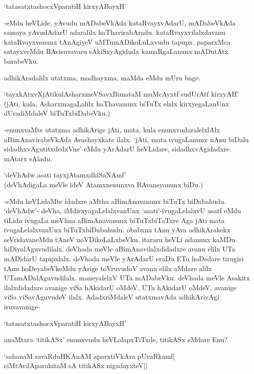 \begin{shloka}
`tatasatxtashocxVparatiH kirxyABayxH'
\end{shloka}

-eMdu heVLide. yAvudu mADabeVkAda kataRvayxvAdarU, mADabeVkAda samaya yAvudAdarU adaralilx haThavirabAradu. kataRvayxvilalxdavanu kataRvayxvanunx tAnAgiyeV uMTumADikoLuLxvudu tapupx. paparxMca satayxveMdu BAvisuvavaru sAkiSxyAgidudx kamaRgaLanunx mADutAtx barabeVku.

adhikAradalilx utatxma, madhayxma, maMda eMdu mUru bage.

`tayxkAtxvXjAtikulAsharxmeVSavxBimataM muMcAyxtf sudUrAtf kirxyAH' (jAti, kula, AsharxmagaLalilx haThavanunx biTuTx elalx kirxyegaLanUnx dUradiMdaleV biTuTxbiDabeVku.)

-enunxvaMte utatxma adhikArige jAti, mata, kula enunxvudaralelxlAlx aBimAnavirabeVkAda Avashayxkate ilalx. `jAti, mata ivugaLanunx nAnu biDalu sidadhxvAgutitxdedxVne' eMdu yArAdarU heVLidare, sidadhxvAgidadxre mAtarx sAladu.

\begin{shloka}
`deVhAdw asati tayxjAtamxdhiSaNAmf'\\
(deVhAdigaLa meVle ideV Atamxnenunxva BAvaneyanunx biDu.)
\end{shloka}

-eMdu heVLidaMte idadxre aMtha aBimAnavanunx biTuTx biDabahudu. `deVhAdw'- deVha, iMdirxyagaLelalxvanUnx `asati'-ivugaLelalxvU asatf eMdu tiLidu ivugaLa meVlina aBimAnavanunx biTuTxbiTaTxre Aga jAti mata ivugaLelalxvanUnx biTuTxbiDabahudu. obabxnu tAnu yAva adhikArakekx seVridavaneMdu tAneV noVDikoLaLxbeVku. itararu heVLi adanunx kaMDu hiDiyalAguvudilalx. deVhada meVle aBimAnavilalxdidadxre avanu elilx UTa mADidarU tapipxlalx. deVhada meVle yArAdarU eraDu ETu hoDedare tirugisi tAnu hoDeyabeVkeMdu yArige toVruvudoV avanu elilx aMdare alilx UTamADalAguvudilalx. maneyalelxV UTa mADabeVku. deVhada meVle Asakitx ilalxdidadxre avanige viSa hAkidarU oMdeV, UTa hAkidarU oMdeV, avanige viSa viSavAguvudeV ilalx. AdadxriMdaleV utatxmavAda adhikAriyAgi iruvavanige- 

\begin{shloka}
`tatasatxtashocxVparatiH kirxyABayxH'
\end{shloka}

anaMtara `titikASx' enunxvudu heVLalapxTiTxde, titikASx eMdare Enu?

\begin{shloka}
`sahanaM savaRduHKAnAM aparxtiVkAra pUvaRkamf|\\
ciMtAvilAparahitaM sA titikASx nigadayxteV||
\end{shloka}

